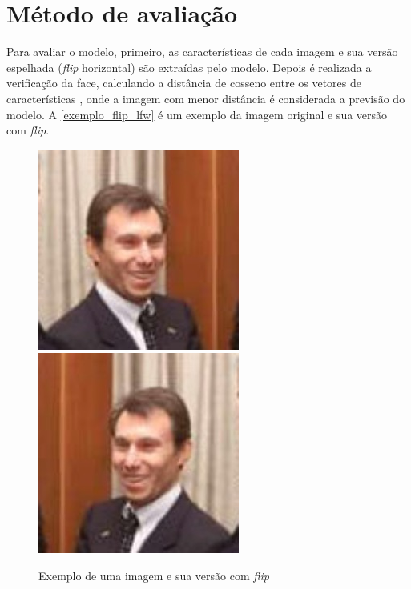 \section{Método de avaliação}\label{sec_avaliacao_modelo}
Para avaliar o modelo, primeiro, as características de cada imagem e sua versão espelhada
(\textit{flip} horizontal) são extraídas pelo modelo. Depois é realizada a verificação da face,
calculando a distância de cosseno entre os vetores de características
\cite{triplet_distillation_face_recognition}, onde a imagem com menor distância é considerada a previsão do
modelo. A \autoref{exemplo_flip_lfw} é um exemplo da imagem original e sua versão com \textit{flip}.

\begin{figure}[htb]
	\begin{center}
		\includegraphics[scale=0.5]{Imagens/exemplo_flip_01}
		\includegraphics[scale=0.5]{Imagens/exemplo_flip_02}
	\end{center}
	\caption {\label{exemplo_flip_lfw}Exemplo de uma imagem e sua versão com \textit{flip}}
\end{figure}


